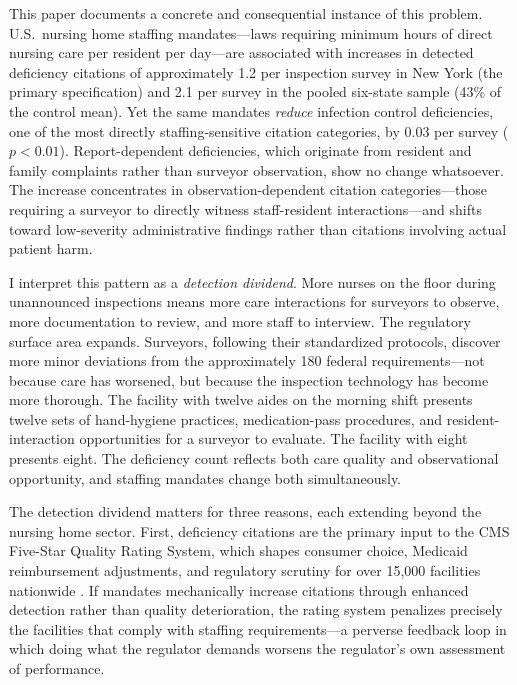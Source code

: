 \documentclass[12pt]{article}
\begin{document}
This paper documents a concrete and consequential instance of this problem. U.S.\ nursing home staffing mandates---laws requiring minimum hours of direct nursing care per resident per day---are associated with increases in detected deficiency citations of approximately 1.2 per inspection survey in New York (the primary specification) and 2.1 per survey in the pooled six-state sample (43\% of the control mean). Yet the same mandates \textit{reduce} infection control deficiencies, one of the most directly staffing-sensitive citation categories, by 0.03 per survey ($p < 0.01$). Report-dependent deficiencies, which originate from resident and family complaints rather than surveyor observation, show no change whatsoever. The increase concentrates in observation-dependent citation categories---those requiring a surveyor to directly witness staff-resident interactions---and shifts toward low-severity administrative findings rather than citations involving actual patient harm.

I interpret this pattern as a \textit{detection dividend}. More nurses on the floor during unannounced inspections means more care interactions for surveyors to observe, more documentation to review, and more staff to interview. The regulatory surface area expands. Surveyors, following their standardized protocols, discover more minor deviations from the approximately 180 federal requirements---not because care has worsened, but because the inspection technology has become more thorough. The facility with twelve aides on the morning shift presents twelve sets of hand-hygiene practices, medication-pass procedures, and resident-interaction opportunities for a surveyor to evaluate. The facility with eight presents eight. The deficiency count reflects both care quality and observational opportunity, and staffing mandates change both simultaneously.

The detection dividend matters for three reasons, each extending beyond the nursing home sector. First, deficiency citations are the primary input to the CMS Five-Star Quality Rating System, which shapes consumer choice, Medicaid reimbursement adjustments, and regulatory scrutiny for over 15,000 facilities nationwide \citep{werner2012, konetzka2021}. If mandates mechanically increase citations through enhanced detection rather than quality deterioration, the rating system penalizes precisely the facilities that comply with staffing requirements---a perverse feedback loop in which doing what the regulator demands worsens the regulator's own assessment of performance.
\end{document}
